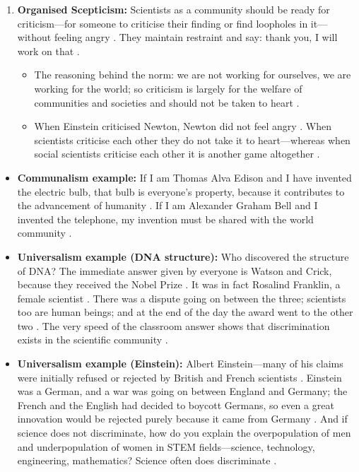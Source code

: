 \begin{enumerate}
\begin{itemize}
    \end{itemize}
    \item \textbf{Organised Scepticism:} Scientists as a community should be ready for criticism---for someone to criticise their finding or find loopholes in it---without feeling angry . They maintain restraint and say: thank you, I will work on that .
    \begin{itemize}
        \item The reasoning behind the norm: we are not working for ourselves, we are working for the world; so criticism is largely for the welfare of communities and societies and should not be taken to heart .
        \item When Einstein criticised Newton, Newton did not feel angry . When scientists criticise each other they do not take it to heart---whereas when social scientists criticise each other it is another game altogether .
    \end{itemize}
\end{enumerate}

\begin{ExampleBox}
\begin{itemize}
    \item \textbf{Communalism example:} If I am Thomas Alva Edison and I have invented the electric bulb, that bulb is everyone's property, because it contributes to the advancement of humanity . If I am Alexander Graham Bell and I invented the telephone, my invention must be shared with the world community .
    \item \textbf{Universalism example (DNA structure):} Who discovered the structure of DNA? The immediate answer given by everyone is Watson and Crick, because they received the Nobel Prize . It was in fact Rosalind Franklin, a female scientist . There was a dispute going on between the three; scientists too are human beings; and at the end of the day the award went to the other two . The very speed of the classroom answer shows that discrimination exists in the scientific community .
    \item \textbf{Universalism example (Einstein):} Albert Einstein---many of his claims were initially refused or rejected by British and French scientists . Einstein was a German, and a war was going on between England and Germany; the French and the English had decided to boycott Germans, so even a great innovation would be rejected purely because it came from Germany . And if science does not discriminate, how do you explain the overpopulation of men and underpopulation of women in STEM fields---science, technology, engineering, mathematics? Science often does discriminate .
\end{itemize}
\end{ExampleBox}

